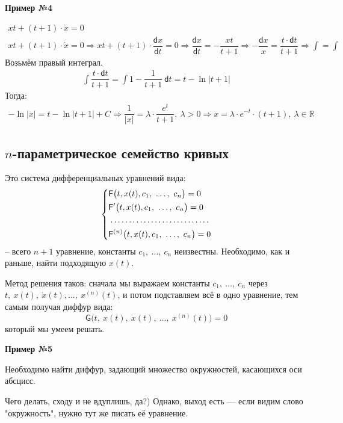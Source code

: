 \documentclass[a4paper,12pt]{article}
\newcommand{\R}{\mathbb{R}}
\renewcommand{\G}{\mathsf{G}}
\renewcommand{\d}{\mathsf{d}}
\newcommand{\dx}{\dot{x}}
\newcommand{\F}{\mathsf{F}}
\newcommand{\ds}{\displaystyle}
\begin{document}
\textbf{Пример №4}

\begin{gather*}
	xt + (t + 1) \cdot \dx = 0\\
	xt + (t + 1) \cdot \dx = 0 \Longrightarrow xt + (t + 1) \cdot \dfrac{\d x}{\d t} = 0 \Longrightarrow \dfrac{\d x}{\d t}  = -\dfrac{xt}{t + 1} \Longrightarrow -\dfrac{\d x}{x} = \dfrac{t \cdot \d t}{t + 1} \Longrightarrow \ds\int = \int
\end{gather*}
Возьмём правый интеграл.
\begin{gather*}
	\ds\int \dfrac{t\cdot \d t}{t + 1} = \ds\int 1 - \dfrac{1}{t + 1}\ \d t = t - \ln |t + 1|
\end{gather*}
Тогда:
\begin{gather*}
	 -\ln|x| = t - \ln |t + 1| + C \Longrightarrow \dfrac{1}{|x|} = \lambda \cdot \dfrac{e^{t}}{t + 1},\ \lambda > 0 \Longrightarrow x = \lambda \cdot e^{-t} \cdot (t + 1),\ \lambda \in \R
\end{gather*}

\subsection{$n$-параметрическое семейство кривых}

Это система дифференциальных уравнений вида:
\[\left\{\begin{gathered}
	\F\big(t, x(t), c_1,\ \ldots,\ c_n\big) = 0\hfill\\
	\F'\big(t, x(t), c_1,\ \ldots,\ c_n\big) = 0\hfill\\
	\dotfill\\
	\F^{(n)}\big(t, x(t), c_1,\ \ldots,\ c_n\big) = 0\hfill
\end{gathered}\right.\] -- всего $n + 1$ уравнение, константы $c_1,\ \ldots,\ c_n$ неизвестны. Необходимо, как и раньше, найти подходящую $x(t)$.

Метод решения таков: сначала мы выражаем константы $c_1,\ \ldots,\ c_n$ через $t,\ x(t),\ \dx(t), \ldots,\ x^{(n)}(t)$, и потом подставляем всё в одно уравнение, тем самым получая диффур вида:
\[\G\big(t,\ x(t),\ \dx(t),\ \ldots,\ x^{(n)}(t)\big) = 0\] который мы умеем решать.

\textbf{Пример №5}

Необходимо найти диффур, задающий множество окружностей, касающихся оси абсцисс.

Чего делать, сходу и не вдуплишь, да?) Однако, выход есть --- если видим слово "окружность", нужно тут же писать её уравнение. 
\end{document}

